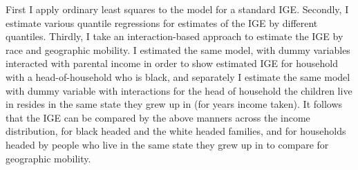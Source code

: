 \documentclass[notitlepage,12pt]{article}
\begin{document}
First I apply ordinary least squares to the model for a standard IGE.  Secondly, I estimate various quantile regressions for estimates of the IGE by different quantiles.  Thirdly, I take an interaction-based approach to estimate the IGE by race and geographic mobility.  I estimated the same model, with dummy variables interacted with parental income in order to show estimated IGE for household with a head-of-household who is black, and separately I estimate the same model with dummy variable with interactions for the head of household the children live in resides in the same state they grew up in (for years income taken).  It follows that the IGE can be compared by the above manners across the income distribution, for black headed and the white headed families, and for households headed by people who live in the same state they grew up in to compare for geographic mobility.
\end{document}
